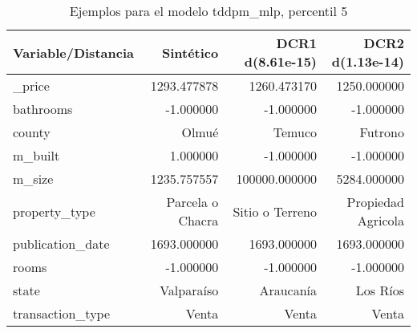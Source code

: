 \begin{table}[H]
\centering
\fontsize{10}{14}\selectfont
\caption{Ejemplos para el modelo tddpm\_mlp, percentil 5}
\label{table-example-economicos-b-1-tddpm_mlp-5p}
\begin{tabular}{|l|r|r|r|}
\hline
\rowcolor[gray]{0.8}
Variable/Distancia & Sintético & DCR1 d(8.61e-15) & DCR2 d(1.13e-14) \\
\hline \_price & \cellcolor[rgb]{0.9, 0.54, 0.52} 1293.477878 & 1260.473170 & 1250.000000 \\
\hline bathrooms & \cellcolor[rgb]{0.9, 0.54, 0.52} -1.000000 & \cellcolor[rgb]{0.9, 0.54, 0.52} -1.000000 & \cellcolor[rgb]{0.9, 0.54, 0.52} -1.000000 \\
\hline county & \cellcolor[rgb]{0.9, 0.54, 0.52} Olmué & Temuco & Futrono \\
\hline m\_built & \cellcolor[rgb]{0.9, 0.54, 0.52} 1.000000 & -1.000000 & -1.000000 \\
\hline m\_size & \cellcolor[rgb]{0.9, 0.54, 0.52} 1235.757557 & 100000.000000 & 5284.000000 \\
\hline property\_type & \cellcolor[rgb]{0.9, 0.54, 0.52} Parcela o Chacra & Sitio o Terreno & Propiedad Agricola \\
\hline publication\_date & \cellcolor[rgb]{0.9, 0.54, 0.52} 1693.000000 & \cellcolor[rgb]{0.9, 0.54, 0.52} 1693.000000 & \cellcolor[rgb]{0.9, 0.54, 0.52} 1693.000000 \\
\hline rooms & \cellcolor[rgb]{0.9, 0.54, 0.52} -1.000000 & \cellcolor[rgb]{0.9, 0.54, 0.52} -1.000000 & \cellcolor[rgb]{0.9, 0.54, 0.52} -1.000000 \\
\hline state & \cellcolor[rgb]{0.9, 0.54, 0.52} Valparaíso & Araucanía & Los Ríos \\
\hline transaction\_type & \cellcolor[rgb]{0.9, 0.54, 0.52} Venta & \cellcolor[rgb]{0.9, 0.54, 0.52} Venta & \cellcolor[rgb]{0.9, 0.54, 0.52} Venta \\
\hline
\end{tabular}
\end{table}
